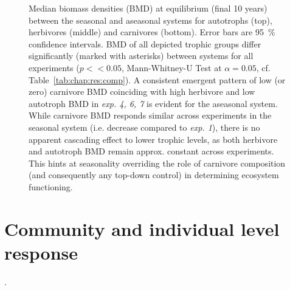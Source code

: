 \begin{figure}
\centering

\caption[Comparison median biomass density (BMD) for aseasonal and seasonal ecosystems]{Median biomass densities (BMD) at equilibrium (final 10 years) between the seasonal and aseasonal systems for autotrophs (top), herbivores (middle) and carnivores (bottom). Error bars are 95~\% confidence intervals. BMD of all depicted trophic groups differ significantly (marked with asterisks) between systems for all experiments ($p << 0.05$, Mann-Whitney-U Test at $\alpha = 0.05$, cf. Table~\ref{tab:chap:res:comp}).%
 A consistent emergent pattern of low (or zero) carnivore BMD coinciding with high herbivore and low autotroph BMD in \textit{exp. 4, 6, 7} is evident for the aseasonal system.
  While carnivore BMD responds similar across experiments in the seasonal system (i.e. decrease compared to \textit{exp. 1}), there is no apparent cascading effect to lower trophic levels, as both herbivore and autotroph BMD remain approx. constant across experiments.
  This hints at seasonality overriding the role of carnivore composition (and consequently any top-down control) in determining ecosystem functioning.}
\label{fig:chap:res:dyn:comp}
\end{figure}




\section{Community and individual level response}
\label{chap:res:popind}
%
.
